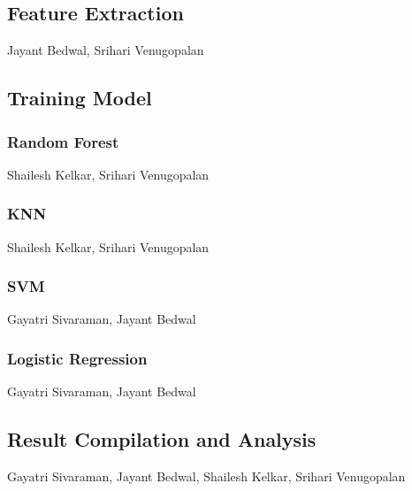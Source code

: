 \documentclass{acm_proc_article-sp}
\begin{document}
\subsection{Feature Extraction}
Jayant Bedwal, Srihari Venugopalan
\subsection{Training Model}
\subsubsection{Random Forest}
Shailesh Kelkar, Srihari Venugopalan
\subsubsection{KNN}
Shailesh Kelkar, Srihari Venugopalan
\subsubsection{SVM}
Gayatri Sivaraman, Jayant Bedwal
\subsubsection{Logistic Regression}
Gayatri Sivaraman, Jayant Bedwal
\subsection{Result Compilation and Analysis}
Gayatri Sivaraman, Jayant Bedwal, Shailesh Kelkar, Srihari Venugopalan
\end{document}
